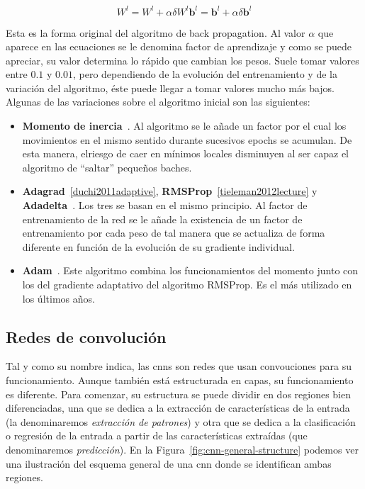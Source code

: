 \begin{subequations}
	\begin{equation}
		W^l = W^l + \alpha \delta W^l \label{eq:error-applied-to-weights}
	\end{equation}
	\begin{equation}
		\mathbf{b}^l = \mathbf{b}^l + \alpha \delta \mathbf{b}^l \label{eq:error-applied-to-bias}
	\end{equation}
\end{subequations}

Esta es la forma original del algoritmo de back propagation. Al valor $\alpha$ que aparece en las ecuaciones se le denomina factor de aprendizaje y como se puede apreciar, su valor determina lo rápido que cambian los pesos. Suele tomar valores entre $0.1$ y $0.01$, pero dependiendo de la evolución del entrenamiento y de la variación del algoritmo, éste puede llegar a tomar valores mucho más bajos. Algunas de las variaciones sobre el algoritmo inicial son las siguientes:

\begin{itemize}
	\item \textbf{Momento de inercia}~\cite{qian1999momentum}. Al algoritmo se le añade un factor por el cual los movimientos en el mismo sentido durante sucesivos epochs se acumulan. De esta manera, elriesgo de caer en mínimos locales disminuyen al ser capaz el algoritmo de \enquote{saltar} pequeños baches.
	\item \textbf{Adagrad}~\ref{duchi2011adaptive}, \textbf{RMSProp}~\ref{tieleman2012lecture} y \textbf{Adadelta}~\cite{zeiler2012adadelta}. Los tres se basan en el mismo principio. Al factor de entrenamiento de la red se le añade la existencia de un factor de entrenamiento por cada peso de tal manera que se actualiza de forma diferente en función de la evolución de su gradiente individual.
	\item \textbf{Adam}~\cite{kingma2014adam}. Este algoritmo combina los funcionamientos del momento junto con los del gradiente adaptativo del algoritmo RMSProp. Es el más utilizado en los últimos años.
\end{itemize}

\subsection{Redes de convolución}

Tal y como su nombre indica, las \acp{cnn} son redes que usan convouciones para su funcionamiento. Aunque también está estructurada en capas, su funcionamiento es diferente. Para comenzar, su estructura se puede dividir en dos regiones bien diferenciadas, una que se dedica a la extracción de características de la entrada (la denominaremos \textit{extracción de patrones}) y otra que se dedica a la clasificación o regresión de la entrada a partir de las características extraídas (que denominaremos \textit{predicción}). En la Figura~\ref{fig:cnn-general-structure} podemos ver una ilustración del esquema general de una \acl{cnn} donde se identifican ambas regiones.

